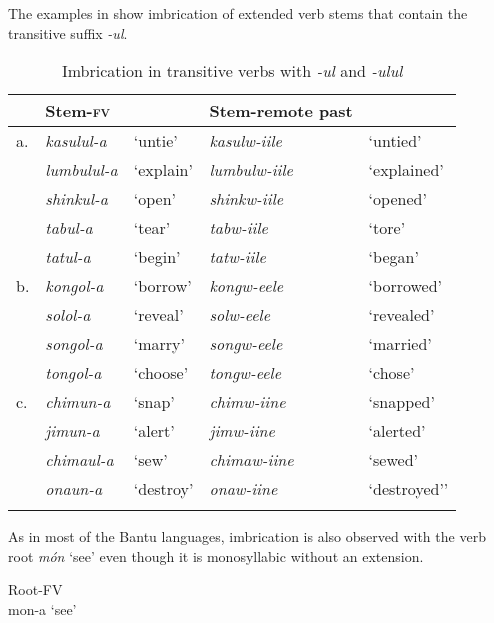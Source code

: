\documentclass[output=paper]{langsci/langscibook}
\begin{document}
\z

The examples in  show imbrication of extended verb stems that contain the transitive suffix \textit{-ul}.


\begin{table}
\begin{tabularx}{\textwidth}{llXlX}
\lsptoprule
 & Stem-\textsc{fv} &  & Stem-remote past & \\
\midrule
a. & \textit{kasulul-a} & `untie' & \textit{kasulw-iile} & `untied' \\
 & \textit{lumbulul-a} & `explain' & \textit{lumbulw-iile} & `explained' \\
 & \textit{shinkul-a} & `open' & \textit{shinkw-iile} & `opened' \\
 & \textit{tabul-a} & `tear' & \textit{tabw-iile} & `tore' \\
 & \textit{tatul-a} & `begin' & \textit{tatw-iile} & `began' \\
\tablevspace
b. & \textit{kongol-a} & `borrow' & \textit{kongw-eele} & `borrowed' \\
 & \textit{solol-a} & `reveal' & \textit{solw-eele} & `revealed' \\
 & \textit{songol-a} & `marry' & \textit{songw-eele} & `married' \\
 & \textit{tongol-a} & `choose' & \textit{tongw-eele} & `chose' \\
\tablevspace
c. & \textit{chimun-a} & `snap' & \textit{chimw-iine} & `snapped' \\
 & \textit{jimun-a} & `alert' & \textit{jimw-iine} & `alerted' \\
 & \textit{chimaul-a} & `sew' & \textit{chimaw-iine} & `sewed' \\
 & \textit{onaun-a} & `destroy' & \textit{onaw-iine} & `destroyed’' \\

\lspbottomrule
\end{tabularx}

\caption{Imbrication in transitive verbs with \textit{-ul} and \textit{-ulul}}
\label{tab:23.kawasha}

\end{table}


As in most of the Bantu languages, imbrication is also observed with the verb root \textit{món} ‘see’ even though it is monosyllabic without an extension. 

\ea\label{ex:8.kawasha}
   \ea\label{ex:8a.kawasha} Root-FV \\
   mon-a ‘see’
   
\end{document}

